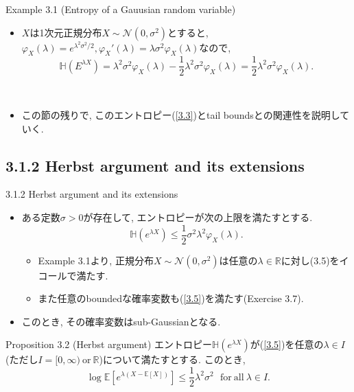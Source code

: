 \documentclass[aspectratio=169, dvipdfmx]{beamer}
\newcommand{\ex}{\mathbb{E}}
\begin{document}
\begin{frame}
\begin{exampleblock}{Example 3.1 (Entropy of a Gauusian random variable)}
    \begin{itemize}
        \item $X$は1次元正規分布$X\sim \mathcal{N}(0, \sigma^2)$とすると, $\varphi_X(\lambda) = e^{\lambda^2\sigma^2/2}, \varphi_X'(\lambda) = \lambda \sigma^2\varphi_X(\lambda)$なので,
        \[ \mathbb{H}(E^{\lambda X}) = \lambda^2\sigma^2\varphi_X(\lambda) - \frac{1}{2}\lambda^2\sigma^2\varphi_X(\lambda) = \frac{1}{2}\lambda^2\sigma^2\varphi_X(\lambda). \tag{3.4}\label{3.4}\]
    \end{itemize}
\end{exampleblock}
　\\
\begin{itemize}
    \item この節の残りで, このエントロピー(\ref{3.3})とtail boundsとの関連性を説明していく.
\end{itemize}
\end{frame}

\subsection{3.1.2 Herbst argument and its extensions}
\begin{frame}{3.1.2 Herbst argument and its extensions}
\begin{itemize}
    \item ある定数$\sigma > 0$が存在して, エントロピーが次の上限を満たすとする.
    \[ \mathbb{H}(e^{\lambda X}) \le \frac{1}{2}\sigma^2 \lambda^2\varphi_X(\lambda).\tag{3.5}\label{3.5} \]
    \begin{itemize}
        \item Example 3.1より, 正規分布$X\sim \mathcal{N}(0,\sigma^2)$は任意の$\lambda \in \mathbb{R}$に対し(3.5)をイコールで満たす.
        \item また任意のboundedな確率変数も(\ref{3.5})を満たす(Exercise 3.7).
    \end{itemize}
    \item このとき, その確率変数はsub-Gaussianとなる.
\end{itemize}
\begin{block}{Proposition 3.2 (Herbst argument)}
    エントロピー$\mathbb{H}(e^{\lambda X})$が(\ref{3.5})を任意の$\lambda \in I$ (ただし$I=[0, \infty)\ \mathrm{or}\ \mathbb{R}$)について満たすとする.
    このとき,
    \[ \log \ex[e^{\lambda(X-\ex[X])}] \le \frac{1}{2}\lambda^2\sigma^2 \ \ \ \mathrm{for\ all}\ \lambda\in I. \tag{3.6}\label{3.6} \]
\end{block}
\end{frame}
\end{document}
